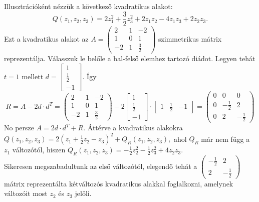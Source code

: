 \documentclass[a4paper, showtrims]{memoir}
\theoremstyle{plain}
\theoremstyle{remark}
\theoremstyle{definition}
\begin{document}
    Illusztrációként nézzük a következő kvadratikus alakot:
    \[
        Q\left( z_1,z_2,z_3 \right)
        =
        2z_1^2+\frac{3}{2}z_3^2+2z_1z_2-4z_1z_3+2z_2z_3.
    \]
    Ezt a kvadratikus alakot az 
    \(A=
    \begin{pmatrix}
        2&1&-2\\
        1&0&1\\
        -2&1&\frac{3}{2}
    \end{pmatrix}
    \)
    szimmetrikus mátrix reprezentálja.
    Válasszuk le belőle a bal-felső elemhez tartozó diádot.
    Legyen tehát $t=1$ mellett
    \(d=
    \begin{bmatrix}
        1\\ \frac{1}{2}\\ -1
    \end{bmatrix}.
    \)
    Így 
    \[
        R=A-2d\cdot d^T
        =
        \begin{pmatrix}
        2&1&-2\\
        1&0&1\\
        -2&1&\frac{3}{2}
        \end{pmatrix}
        -2
        \begin{bmatrix}
        1\\ \frac{1}{2}\\ -1
        \end{bmatrix}
        \cdot
        \begin{bmatrix}
        1& \frac{1}{2}& -1
        \end{bmatrix}
        =
        \begin{pmatrix}
            0&0&0\\
            0&-\frac{1}{2}&2\\
            0&2&-\frac{1}{2}
        \end{pmatrix}
    \]
    No persze $A=2d\cdot d^T+R$.
    Áttérve a kvadratikus alakokra
    \(
        Q\left( z_1,z_2,z_3 \right)=2\left( z_1+\frac{1}{2}z_2-z_3 \right)^2+Q_R\left( z_1,z_2,z_3 \right),
    \)
    ahol $Q_R$ már nem függ a $z_1$ változótól, 
    hiszen $Q_R\left( z_1,z_2,z_3 \right)=-\frac{1}{2}z_2^2-\frac{1}{2}z_3^2+4z_2z_3$.
    \\
    Sikeresen megszabadultunk az első változótól, elegendő tehát a 
    \(
    \begin{pmatrix}
        -\frac{1}{2}&2\\
        2&-\frac{1}{2}
    \end{pmatrix}
    \)
    mátrix reprezentálta kétváltozós kvadratikus alakkal foglalkozni, amelynek változóit most $z_2$ és $z_3$ jelöli.
\end{document}
